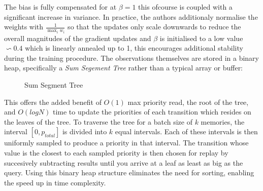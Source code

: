 The bias is fully compensated for at $\beta = 1$ this ofcourse is coupled with a significant
increase in variance. In practice, the authors additionaly normalise the weights with $\frac{1}{\max_i w_i}$
so that the updates only scale downwards to reduce the overall magnitudes of the gradient updates
and $\beta$ is initialised to a low value $\backsim 0.4$ which is 
linearly annealed up to 1, this encourages additional stability during the training procedure.
The observations themselves are stored in a binary heap, specifically a \emph{Sum Segement Tree} rather
than a typical array or buffer:
\begin{figure}[!htb]
    \caption{Sum Segment Tree}
    \begin{center}
    \end{center}
\end{figure}
This offers the added benefit of $O(1)$ max priority read, the root of the tree, and 
$O(log N)$ time to update the priorities of each transition which resides on the leaves of
the tree. To traverse the tree for a batch size of $k$ memories, the interval $[0, p_{total}]$ is divided into $k$ equal intervals.
Each of these intervals is then uniformly sampled to produce a priority in that interval. The
transition whose value is the closest to each sampled priority is then chosen for replay by succesively
subtracting results until you arrive at a leaf as least as big as the query. Using this binary heap structure eliminates the
need for sorting, enabling the speed up in time complexity.
